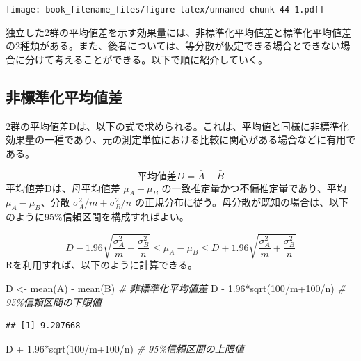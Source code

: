 \documentclass[
  ja=standard, xelatex, base=12pt]{bxjsreport}
\newenvironment{Shaded}{\begin{snugshade}}{\end{snugshade}}
\newcommand{\CommentTok}[1]{\textcolor[rgb]{0.56,0.35,0.01}{\textit{#1}}}
\newcommand{\DecValTok}[1]{\textcolor[rgb]{0.00,0.00,0.81}{#1}}
\newcommand{\FloatTok}[1]{\textcolor[rgb]{0.00,0.00,0.81}{#1}}
\newcommand{\FunctionTok}[1]{\textcolor[rgb]{0.00,0.00,0.00}{#1}}
\newcommand{\NormalTok}[1]{#1}
\newcommand{\OtherTok}[1]{\textcolor[rgb]{0.56,0.35,0.01}{#1}}
\newcommand{\SpecialCharTok}[1]{\textcolor[rgb]{0.00,0.00,0.00}{#1}}
\begin{document}
\texttt{[image: book\_filename\_files/figure-latex/unnamed-chunk-44-1.pdf]}

独立した2群の平均値差を示す効果量には、非標準化平均値差と標準化平均値差の2種類がある。また、後者については、等分散が仮定できる場合とできない場合に分けて考えることができる。以下で順に紹介していく。

\hypertarget{ux975eux6a19ux6e96ux5316ux5e73ux5747ux5024ux5dee-2}{%
\subsection{非標準化平均値差}\label{ux975eux6a19ux6e96ux5316ux5e73ux5747ux5024ux5dee-2}}

2群の平均値差Dは、以下の式で求められる。これは、平均値と同様に非標準化効果量の一種であり、元の測定単位における比較に関心がある場合などに有用である。

\[
平均値差D=\bar{A}-\bar{B}
\] 平均値差Dは、母平均値差 \(\mu_A-\mu_B\) の一致推定量かつ不偏推定量であり、平均\(\mu_A-\mu_B\)、分散 \(\sigma_A^2/m+\sigma_B^2/n\) の正規分布に従う。母分散が既知の場合は、以下のように95\%信頼区間を構成すればよい。

\[
D-1.96\sqrt{\frac{\sigma_A^2}{m}+\frac{\sigma_B^2}{n}}\leq\mu_A-\mu_B\leq D+1.96\sqrt{\frac{\sigma_A^2}{m}+\frac{\sigma_B^2}{n}}
\] Rを利用すれば、以下のように計算できる。

\begin{Shaded}
\begin{Highlighting}[]
\NormalTok{D }\OtherTok{\textless{}{-}} \FunctionTok{mean}\NormalTok{(A) }\SpecialCharTok{{-}} \FunctionTok{mean}\NormalTok{(B)     }\CommentTok{\# 非標準化平均値差}
\NormalTok{D }\SpecialCharTok{{-}} \FloatTok{1.96}\SpecialCharTok{*}\FunctionTok{sqrt}\NormalTok{(}\DecValTok{100}\SpecialCharTok{/}\NormalTok{m}\SpecialCharTok{+}\DecValTok{100}\SpecialCharTok{/}\NormalTok{n) }\CommentTok{\# 95\%信頼区間の下限値}
\end{Highlighting}
\end{Shaded}

\begin{verbatim}
## [1] 9.207668
\end{verbatim}

\begin{Shaded}
\begin{Highlighting}[]
\NormalTok{D }\SpecialCharTok{+} \FloatTok{1.96}\SpecialCharTok{*}\FunctionTok{sqrt}\NormalTok{(}\DecValTok{100}\SpecialCharTok{/}\NormalTok{m}\SpecialCharTok{+}\DecValTok{100}\SpecialCharTok{/}\NormalTok{n) }\CommentTok{\# 95\%信頼区間の上限値}
\end{Highlighting}
\end{Shaded}
\end{document}
